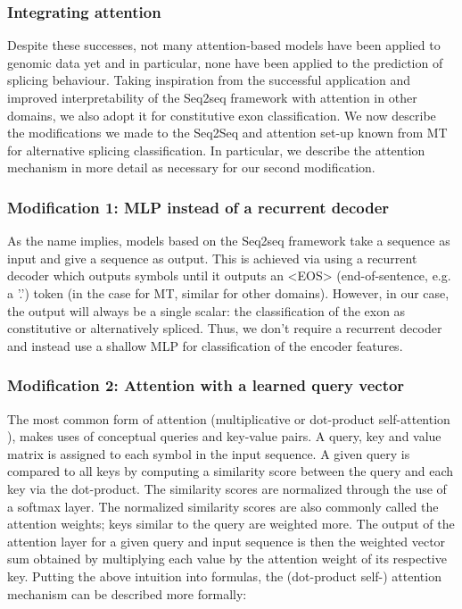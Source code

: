 \subsubsection{Integrating attention}
Despite these successes, not many attention-based models have been applied to genomic data yet and in particular, none have been applied to the prediction of splicing behaviour. 
Taking inspiration from the successful application and improved interpretability of the Seq2seq framework with attention in other domains, we also adopt it for constitutive exon classification. We now describe the modifications we made to the Seq2Seq and attention set-up known from MT for alternative splicing classification. In particular, we describe the attention mechanism in more detail as necessary for our second modification.
\subsubsection{Modification 1: MLP instead of a recurrent decoder}
As the name implies, models based on the Seq2seq framework take a sequence as input and give a sequence as output. This is achieved via using a recurrent decoder which outputs symbols until it outputs an <EOS> (end-of-sentence, e.g. a '.') token (in the case for MT, similar for other domains). However, in our case, the output will always be a single scalar: the classification of the exon as constitutive or alternatively spliced. Thus, we don't require a recurrent decoder and instead use a shallow MLP for classification of the encoder features.
\subsubsection{Modification 2: Attention with a learned query vector}
The most common form of attention (multiplicative or dot-product self-attention \cite{allyouneed}), makes uses of conceptual queries and key-value pairs. A query, key and value matrix is assigned to each symbol in the input sequence. A given query is compared to all keys by computing a similarity score between the query and each key via the dot-product. The similarity scores are normalized through the use of a softmax layer. The normalized similarity scores are also commonly called the attention weights; keys similar to the query are weighted more. The output of the attention layer for a given query and input sequence is then the weighted vector sum obtained by multiplying each value by the attention weight of its respective key.
Putting the above intuition into formulas, the (dot-product self-) attention mechanism can be described more formally:


